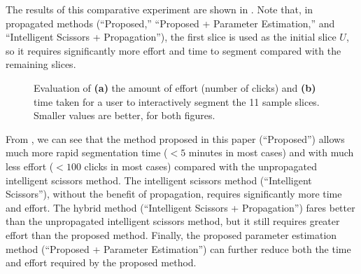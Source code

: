 \documentclass[]{spie}  %
\begin{document}
The results of this comparative experiment are shown in .
Note that, in propagated methods (``Proposed,'' ``Proposed + Parameter
Estimation,'' and ``Intelligent Scissors + Propagation''), the first
slice is used as the initial slice $U$, so it requires significantly
more effort and time to segment compared with the remaining slices.
\begin{figure}[htbp]
\centering
{}
\hspace{0.1em}
\caption{Evaluation of \textbf{(a)} the amount of effort (number of
  clicks) and \textbf{(b)} time taken for a user to interactively
  segment the 11 sample slices.  Smaller values are better, for both
  figures.} \label{fig:ex}
\end{figure}
From , we can see that the method proposed in this paper
(``Proposed'') allows much more rapid segmentation time ($< 5$ minutes
in most cases) and with much less effort ($< 100$ clicks in most
cases) compared with the unpropagated intelligent scissors method.
The intelligent scissors method (``Intelligent Scissors''), without
the benefit of propagation, requires significantly more time and
effort.  The hybrid method (``Intelligent Scissors + Propagation'')
fares better than the unpropagated intelligent scissors method, but it
still requires greater effort than the proposed method.  Finally, the
proposed parameter estimation method (``Proposed + Parameter
Estimation'') can further reduce both the time and effort required by
the proposed method.
\end{document}
